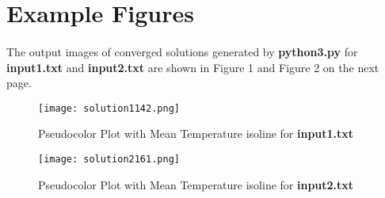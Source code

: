 \documentclass[12pt,letterpaper]{article}
\begin{document}
\section{Example Figures}
\paragraph{} The output images of converged solutions generated by \textbf{python3.py} for \textbf{input1.txt} and \textbf{input2.txt} are shown in Figure 1 and Figure 2 on the next page.
\begin{figure}
\begin{center}
\texttt{[image: solution1142.png]}
\caption{Pseudocolor Plot with Mean Temperature isoline for \textbf{input1.txt}}
\label{fig:input1}
\end{center}
\end{figure}
\begin{figure}
\begin{center}
\texttt{[image: solution2161.png]}
\caption{Pseudocolor Plot with Mean Temperature isoline for \textbf{input2.txt}}
\label{fig:input2}
\end{center}
\end{figure}


\end{document}
